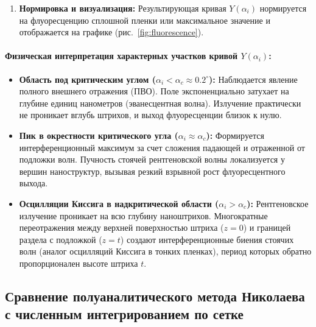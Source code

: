 \documentclass[a4paper,11pt]{article}
\begin{document}
\begin{enumerate}
\begin{enumerate}
        \item По аналитическим формулам (\ref{eq:w1})--(\ref{eq:w_sum}) вычисляется матрица вертикального перекрытия мод $W$;
        \item Выполняется матричное умножение $M = E W E^H$;
        \item Вычисляется произведение Адамара $F = U \odot M$ и суммируются все его элементы: $Y(\alpha_i) = \sum_{g, h} F_{gh}$.
    \end{enumerate}
    \item \textbf{Нормировка и визуализация:} Результирующая кривая $Y(\alpha_i)$ нормируется на флуоресценцию сплошной пленки или максимальное значение и отображается на графике (рис.~\ref{fig:fluorescence}).
\end{enumerate}

\paragraph{Физическая интерпретация характерных участков кривой $Y(\alpha_i)$:}
\begin{itemize}
    \item \textbf{Область под критическим углом ($\alpha_i < \alpha_c \approx 0.2^\circ$):} Наблюдается явление полного внешнего отражения (ПВО). Поле экспоненциально затухает на глубине единиц нанометров (эванесцентная волна). Излучение практически не проникает вглубь штрихов, и выход флуоресценции близок к нулю.
    \item \textbf{Пик в окрестности критического угла ($\alpha_i \approx \alpha_c$):} Формируется интерференционный максимум за счет сложения падающей и отраженной от подложки волн. Пучность стоячей рентгеновской волны локализуется у вершин наноструктур, вызывая резкий взрывной рост флуоресцентного выхода.
    \item \textbf{Осцилляции Киссига в надкритической области ($\alpha_i > \alpha_c$):} Рентгеновское излучение проникает на всю глубину наноштрихов. Многократные переотражения между верхней поверхностью штриха ($z = 0$) и границей раздела с подложкой ($z = t$) создают интерференционные биения стоячих волн (аналог осцилляций Киссига в тонких пленках), период которых обратно пропорционален высоте штриха $t$.
\end{itemize}

\subsection{Сравнение полуаналитического метода Николаева с численным интегрированием по сетке}
\end{document}
